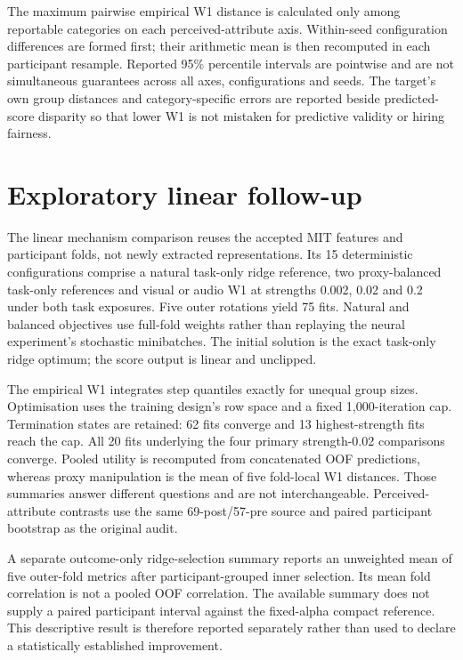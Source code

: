 The maximum pairwise empirical W1 distance is calculated only among reportable categories
on each perceived-attribute axis. Within-seed configuration differences are formed first;
their arithmetic mean is then recomputed in each participant resample. Reported 95\%
percentile intervals are pointwise and are not simultaneous guarantees across all axes,
configurations and seeds. The target's own group distances and category-specific errors
are reported beside predicted-score disparity so that lower W1 is not mistaken for
predictive validity or hiring fairness.

\section{Exploratory linear follow-up}

The linear mechanism comparison reuses the accepted MIT features and participant folds,
not newly extracted representations. Its 15 deterministic configurations comprise a
natural task-only ridge reference, two proxy-balanced task-only references and visual
or audio W1 at strengths 0.002, 0.02 and 0.2 under both task exposures. Five outer
rotations yield 75 fits. Natural and balanced objectives use full-fold weights rather
than replaying the neural experiment's stochastic minibatches. The initial solution
is the exact task-only ridge optimum; the score output is linear and unclipped.

The empirical W1 integrates step quantiles exactly for unequal group sizes. Optimisation
uses the training design's row space and a fixed 1,000-iteration cap. Termination states
are retained: 62 fits converge and 13 highest-strength fits reach the cap. All 20 fits
underlying the four primary strength-0.02 comparisons converge. Pooled utility is
recomputed from concatenated OOF predictions, whereas proxy manipulation is the mean
of five fold-local W1 distances. Those summaries answer different questions and are
not interchangeable. Perceived-attribute contrasts use the same 69-post/57-pre source
and paired participant bootstrap as the original audit.

A separate outcome-only ridge-selection summary reports an unweighted mean of
five outer-fold metrics after participant-grouped inner selection. Its mean fold
correlation is not a pooled OOF correlation. The available summary does not supply
a paired participant interval against the fixed-alpha compact reference. This
descriptive result is therefore reported separately rather than used to declare
a statistically established improvement.

